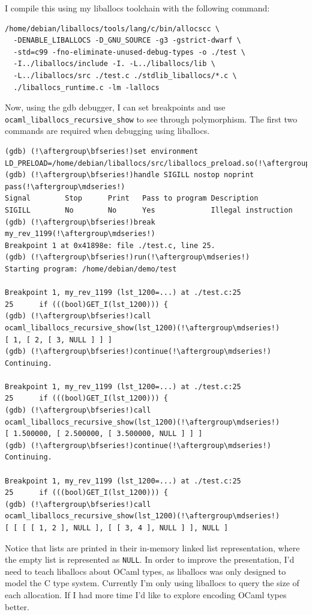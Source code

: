 \documentclass[12pt,a4paper,twoside,openright]{report}
\begin{document}
I compile this using my liballocs toolchain with the following command:
\begin{lstlisting}
/home/debian/liballocs/tools/lang/c/bin/allocscc \
  -DENABLE_LIBALLOCS -D_GNU_SOURCE -g3 -gstrict-dwarf \
  -std=c99 -fno-eliminate-unused-debug-types -o ./test \
  -I../liballocs/include -I. -L../liballocs/lib \
  -L../liballocs/src ./test.c ./stdlib_liballocs/*.c \
  ./liballocs_runtime.c -lm -lallocs
\end{lstlisting}

Now, using the gdb debugger, I can set breakpoints and use
\lstinline!ocaml_liballocs_recursive_show! to see through polymorphism. The
first two commands are required when debugging using liballocs.

\begin{lstlisting}
(gdb) (!\aftergroup\bfseries!)set environment LD_PRELOAD=/home/debian/liballocs/src/liballocs_preload.so(!\aftergroup\mdseries!)
(gdb) (!\aftergroup\bfseries!)handle SIGILL nostop noprint pass(!\aftergroup\mdseries!)
Signal        Stop      Print   Pass to program Description
SIGILL        No        No      Yes             Illegal instruction
(gdb) (!\aftergroup\bfseries!)break my_rev_1199(!\aftergroup\mdseries!)
Breakpoint 1 at 0x41898e: file ./test.c, line 25.
(gdb) (!\aftergroup\bfseries!)run(!\aftergroup\mdseries!)
Starting program: /home/debian/demo/test

Breakpoint 1, my_rev_1199 (lst_1200=...) at ./test.c:25
25      if (((bool)GET_I(lst_1200))) {
(gdb) (!\aftergroup\bfseries!)call ocaml_liballocs_recursive_show(lst_1200)(!\aftergroup\mdseries!)
[ 1, [ 2, [ 3, NULL ] ] ]
(gdb) (!\aftergroup\bfseries!)continue(!\aftergroup\mdseries!)
Continuing.

Breakpoint 1, my_rev_1199 (lst_1200=...) at ./test.c:25
25      if (((bool)GET_I(lst_1200))) {
(gdb) (!\aftergroup\bfseries!)call ocaml_liballocs_recursive_show(lst_1200)(!\aftergroup\mdseries!)
[ 1.500000, [ 2.500000, [ 3.500000, NULL ] ] ]
(gdb) (!\aftergroup\bfseries!)continue(!\aftergroup\mdseries!)
Continuing.

Breakpoint 1, my_rev_1199 (lst_1200=...) at ./test.c:25
25      if (((bool)GET_I(lst_1200))) {
(gdb) (!\aftergroup\bfseries!)call ocaml_liballocs_recursive_show(lst_1200)(!\aftergroup\mdseries!)
[ [ [ [ 1, 2 ], NULL ], [ [ 3, 4 ], NULL ] ], NULL ]
\end{lstlisting}

Notice that lists are printed in their in-memory linked list representation,
where the empty list is represented as \lstinline!NULL!. In order to improve the
presentation, I'd need to teach liballocs about OCaml types, as liballocs was
only designed to model the C type system. Currently I'm only
using liballocs to query the size of each allocation. If I had more time I'd like
to explore encoding OCaml types better.
\end{document}

